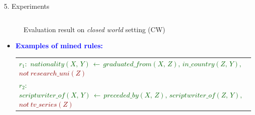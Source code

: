 \documentclass[t,final,hyperref={pdfpagelabels=true}]{beamer}
\newcommand{\red}[1]{\textcolor{darkred}{#1}}
\newcommand{\bl}[1]{\textcolor{blue}{#1}}
\newcommand{\gr}[1]{\textcolor{darkgreen}{#1}}
\newcommand{\mi}[1]{\ensuremath{\mathit{#1}}}
\begin{document}
\begin{frame}
\begin{columns}[t]
\begin{column}{0.5\textwidth}
\begin{block}{5. Experiments}
\begin{columns}
\begin{column}{1.02\textwidth}
\begin{figure}[t]
							\caption{Evaluation result on \textit{closed world} setting (CW)}
							\label{fig:diff_lambda}
						\end{figure}
						\small
						\vspace{-0.8em}
						\begin{itemize}
							\item \textbf{\bl{Examples of mined rules:}}
							      
							      
							      				
							      \bigskip
							      				
							      \begin{tabular}{l}
							      	\small                                                                                                                              
							      	\gr{$r_1{:}$  $\mi{nationality(X{,}\, Y)}\, {\leftarrow}\, \mi{graduated\_from(X{,}\, Z)}{,}\, \mi{in\_country(Z{,}\, Y)},$}        
							      	\red{$not\ \mi{research\_uni(Z)}$}                                                                                                  \\
							      	\small                                                                                                                              
							      	\gr{$r_2{:}$  $\mi{scriptwriter\_of}(X{,}\, Y)\, {\leftarrow}\, \mi{preceded\_by(X{,}\, Z)}{,}\, \mi{scriptwriter\_of(Z{,}\, Y)},$} 
							      	\red{$not\ \mi{tv\_series(Z)}$}                                                                                                     
							      \end{tabular} 
						\end{itemize}

						

\end{column}
\end{columns}
\end{block}
\end{column}
\end{columns}
\end{frame}
\end{document}
